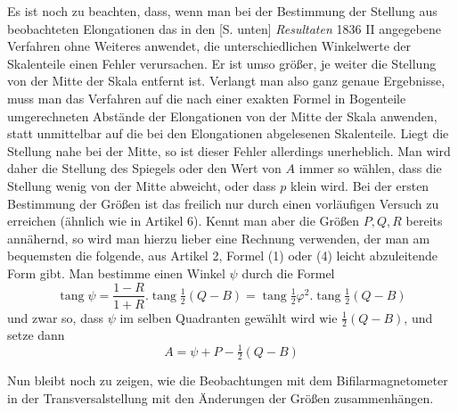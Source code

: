 Es ist noch zu beachten, dass, wenn man bei der Bestimmung der Stellung aus beobachteten Elongationen das in den [S. unten] \textit{Resultaten} 1836 II
angegebene Verfahren ohne Weiteres anwendet, die unterschiedlichen Winkelwerte der Skalenteile einen Fehler verursachen. Er ist umso größer, je weiter die Stellung von der Mitte der Skala entfernt ist. Verlangt man also ganz genaue Ergebnisse, muss man das Verfahren auf die nach einer exakten Formel in Bogenteile umgerechneten Abstände der Elongationen von der Mitte der Skala anwenden, statt unmittelbar auf die bei den Elongationen abgelesenen Skalenteile. Liegt die Stellung nahe bei der Mitte, so ist dieser Fehler allerdings unerheblich. Man wird daher die Stellung des Spiegels oder den Wert von $A$ immer so wählen, dass die Stellung wenig von der Mitte abweicht, oder dass $p$ klein wird. Bei der ersten Bestimmung der Größen ist das freilich nur durch einen vorläufigen Versuch zu erreichen (ähnlich wie in Artikel 6). Kennt man aber die Größen $P,Q,R$ bereits annähernd, so wird man hierzu lieber eine Rechnung verwenden, der man am bequemsten die folgende, aus Artikel 2, Formel (1) oder (4) leicht abzuleitende Form gibt. Man bestimme einen Winkel $\psi$ durch die Formel
\[
\operatorname{tang}\psi=\frac{1-R}{1+R}.\operatorname{tang}\tfrac12(Q-B)=\operatorname{tang}\tfrac12\varphi^2.\operatorname{tang}\tfrac12(Q-B)
\]
und zwar so, dass $\psi$ im selben Quadranten gewählt wird wie $\tfrac12(Q-B)$, und setze dann
\[
A=\psi+P-\tfrac12(Q-B)
\]

Nun bleibt noch zu zeigen, wie die Beobachtungen mit dem Bifilarmagnetometer in der Transversalstellung mit den Änderungen der Größen zusammenhängen.

